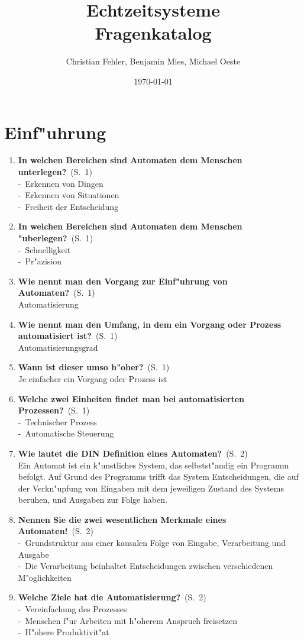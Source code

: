 \documentclass[a4paper,latin1,12pt]{article}
\title{{\Huge Echtzeitsysteme}\\Fragenkatalog}
\author{{\Large Christian Fehler, Benjamin Mies, Michael Oeste}}
\date{\small\today}
\newcommand{\question}[3]{\pagebreak[3]\item {\textbf{#1?}}\ (S.\ #2)#3}
\newcommand{\statement}[3]{\pagebreak[3]\item {\textbf{#1!}}\ (S.\ #2)#3}
\newcommand{\catchword}[1]{\\-\ #1}
\newcommand{\normaltext}[1]{\\#1}
\newcommand{\page}[1]{#1}
\begin{document}
\maketitle
\newpage
\tableofcontents

\newpage
\section{Einf"uhrung}

\begin{enumerate}

  \question{In welchen Bereichen sind Automaten dem Menschen unterlegen}{\page{1}}
  {
    \catchword{Erkennen von Dingen}
    \catchword{Erkennen von Situationen}
    \catchword{Freiheit der Entscheidung}
  }

  \question{In welchen Bereichen sind Automaten dem Menschen "uberlegen}{\page{1}}
  {
    \catchword{Schnelligkeit}
    \catchword{Pr"azision}
  }

  \question{Wie nennt man den Vorgang zur Einf"uhrung von Automaten}{\page{1}}
  {
   \normaltext{Automatisierung}
  }

  \question{Wie nennt man den Umfang, in dem ein Vorgang oder Prozess automatisiert ist}{\page{1}}
  {
    \normaltext{Automatisierungsgrad}
  }

  \question{Wann ist dieser umso h"oher}{\page{1}}
  {
    \normaltext{Je einfacher ein Vorgang oder Prozess ist}
  }

  \question{Welche zwei Einheiten findet man bei automatisierten Prozessen}{\page{1}}
  {
    \catchword{Technischer Prozess}
    \catchword{Automatische Steuerung}
  }

  \question{Wie lautet die DIN Definition eines Automaten}{\page{2}}
  {
    \normaltext{Ein Automat ist ein k"unstliches System, das selbstst"andig ein Programm
                befolgt. Auf Grund des Programms trifft das System Entscheidungen, die
                auf der Verkn"upfung von Eingaben mit dem jeweiligen Zustand des Systems
                beruhen, und Ausgaben zur Folge haben.}
  }

  \statement{Nennen Sie die zwei wesentlichen Merkmale eines Automaten}{\page{2}}
  {
    \catchword{Grundstruktur aus einer kausalen Folge von Eingabe, Verarbeitung und Ausgabe}
    \catchword{Die Verarbeitung beinhaltet Entscheidungen zwischen verschiedenen M"oglichkeiten}
  }

  \question{Welche Ziele hat die Automatisierung}{\page{2}}
  {
    \catchword{Vereinfachung des Prozesses}
    \catchword{Menschen f"ur Arbeiten mit h"oherem Anspruch freisetzen}
    \catchword{H"ohere Produktivit"at}
  }


\end{enumerate}
\end{document}
